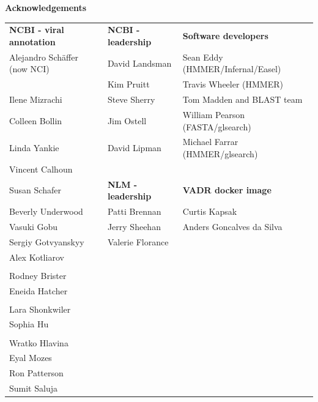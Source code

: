 \documentclass[landscape]{slides}
\begin{document}
\begin{slide}

\large
\begin{center}
\large{\textbf{Acknowledgements}} \\

\normalsize
\vspace{0.75in}

\small
\begin{tabular}{l|l|l}
\textbf{NCBI - viral annotation} & \textbf{NCBI - leadership} &  \textbf{Software developers} \\
Alejandro Sch\"{a}ffer (now NCI) & David Landsman             & Sean Eddy (HMMER/Infernal/Easel)\\
                                 & Kim Pruitt                 & Travis Wheeler (HMMER)\\
Ilene Mizrachi                   & Steve Sherry               & Tom Madden and BLAST team \\
Colleen Bollin                   & Jim Ostell                 & William Pearson (FASTA/glsearch) \\
Linda Yankie                     & David Lipman               & Michael Farrar (HMMER/glsearch) \\
Vincent Calhoun                  &                            & \\
Susan Schafer                    & \textbf{NLM - leadership}  & \textbf{VADR docker image} \\
Beverly Underwood                & Patti Brennan              & Curtis Kapsak \\
Vasuki Gobu                      & Jerry Sheehan              & Anders Goncalves da Silva \\
Sergiy Gotvyanskyy               & Valerie Florance           & \\
Alex Kotliarov                   & & \\
& & \\
Rodney Brister                   & & \\
Eneida Hatcher                   & & \\
& & \\
Lara Shonkwiler                  & & \\
Sophia Hu                        & & \\
& & \\
Wratko Hlavina                   & & \\
Eyal Mozes                       & & \\
Ron Patterson                    & & \\
Sumit Saluja                     & & \\ 
\end{tabular}


\end{center}
\end{slide}
\end{document}
